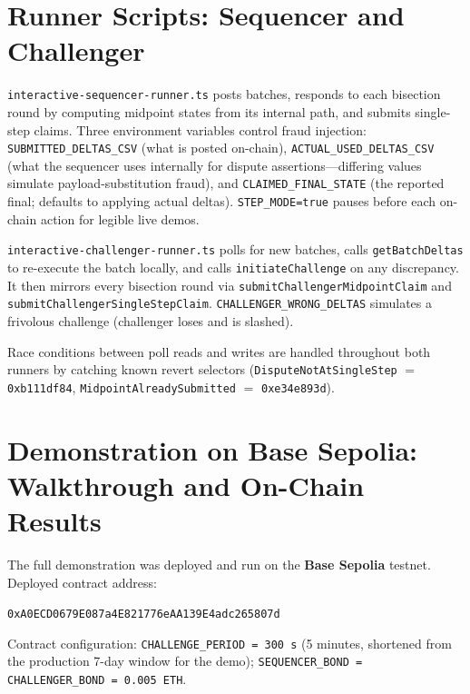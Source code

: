 \documentclass[11pt,letterpaper]{article}
\begin{document}
\section{Runner Scripts: Sequencer and Challenger}

\texttt{interactive-sequencer-runner.ts} posts batches, responds to each bisection round by computing midpoint states from its internal path, and submits single-step claims. Three environment variables control fraud injection: \texttt{SUBMITTED\_DELTAS\_CSV} (what is posted on-chain), \texttt{ACTUAL\_USED\_DELTAS\_CSV} (what the sequencer uses internally for dispute assertions---differing values simulate payload-substitution fraud), and \texttt{CLAIMED\_FINAL\_STATE} (the reported final; defaults to applying actual deltas). \texttt{STEP\_MODE=true} pauses before each on-chain action for legible live demos.

\texttt{interactive-challenger-runner.ts} polls for new batches, calls \texttt{getBatchDeltas} to re-execute the batch locally, and calls \texttt{initiateChallenge} on any discrepancy. It then mirrors every bisection round via \texttt{submitChallengerMidpointClaim} and \texttt{submitChallengerSingleStepClaim}. \texttt{CHALLENGER\_WRONG\_DELTAS} simulates a frivolous challenge (challenger loses and is slashed).

Race conditions between poll reads and writes are handled throughout both runners by catching known revert selectors (\texttt{DisputeNotAtSingleStep} $=$ \texttt{0xb111df84}, \texttt{MidpointAlreadySubmitted} $=$ \texttt{0xe34e893d}).

\section{Demonstration on Base Sepolia: Walkthrough and On-Chain Results}

The full demonstration was deployed and run on the \textbf{Base Sepolia} testnet. Deployed contract address:

\begin{center}
\texttt{0xA0ECD0679E087a4E821776eAA139E4adc265807d}
\end{center}

\noindent Contract configuration: \texttt{CHALLENGE\_PERIOD = 300 s} (5 minutes, shortened from the production 7-day window for the demo); \texttt{SEQUENCER\_BOND = CHALLENGER\_BOND = 0.005 ETH}.
\end{document}
